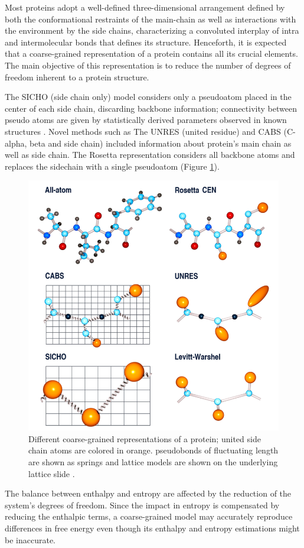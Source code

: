 \documentclass[
	12pt,				%
	openright,			%
	twoside,			%
	a4paper,			%
	english,			%
	french,				%
	spanish,			%
	brazil,				%
	]{abntex2}
\begin{document}
Most proteins adopt a well-defined three-dimensional arrangement defined by both the conformational restraints of the main-chain as well as interactions with the environment by the side chains, characterizing a convoluted interplay of intra and intermolecular bonds that defines its structure. Henceforth, it is expected that a coarse-grained representation of a protein contains all its crucial elements. The main objective of this representation is to reduce the number of degrees of freedom inherent to a protein structure. 

The SICHO (side chain only) model considers only a pseudoatom placed in the center of each side chain, discarding backbone information; connectivity between pseudo atoms are given by statistically derived parameters observed in known structures \cite{Kolinski1998}. Novel methods such as The UNRES (united residue) \cite{Liwo2014} and CABS (C-alpha, beta and side chain) \cite{Kurcinski2015} included information about protein’s main chain as well as side chain. The Rosetta representation considers all backbone atoms and replaces the sidechain with a single pseudoatom \cite{johnson2004numerical} (Figure \ref{fig:rep}).

\begin{figure}
	\centering
	\includegraphics[width=0.7\linewidth]{figures/rep}
	\caption{Different coarse-grained representations of a protein; united side chain atoms are colored in orange. pseudobonds of fluctuating length are shown as springs and lattice models are shown on the underlying lattice slide \cite{Kmiecik2016}.}
	\label{fig:rep}
\end{figure}

The balance between enthalpy and entropy are affected by the reduction of the system’s degrees of freedom. Since the impact in entropy is compensated by reducing the enthalpic terms, a coarse-grained model may accurately reproduce differences in free energy even though its enthalpy and entropy estimations might be inaccurate.
\end{document}
